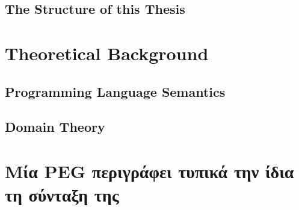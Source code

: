 \documentclass[diploma]{softlab-thesis}
\begin{document}
\section{The Structure of this Thesis}

\chapter{Theoretical Background}

\section{Programming Language Semantics}

\section{Domain Theory}




\nocite{*}






\backmatter

\appendix

\chapter{Μία PEG περιγράφει τυπικά την ίδια τη σύνταξη της}
\end{document}
